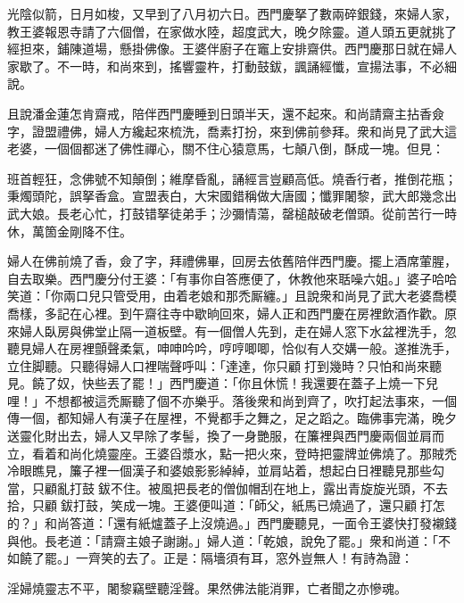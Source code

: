 光陰似箭，日月如梭，又早到了八月初六日。西門慶拏了數兩碎銀錢，來婦人家，教王婆報恩寺請了六個僧，在家做水陸，超度武大，晚夕除靈。道人頭五更就挑了經担來，鋪陳道場，懸掛佛像。王婆伴廚子在竈上安排齋供。西門慶那日就在婦人家歇了。不一時，和尚來到，搖響靈杵，打動鼓鈸，諷誦經懺，宣揚法事，不必細說。

且說潘金蓮怎肯齋戒，陪伴西門慶睡到日頭半天，還不起來。和尚請齋主拈香僉字，證盟禮佛，婦人方纔起來梳洗，喬素打扮，來到佛前參拜。衆和尚見了武大這老婆，一個個都迷了佛性禪心，關不住心猿意馬，七顛八倒，酥成一塊。但見：

\begin{myquote} 
班首輕狂，念佛號不知顛倒；維摩昏亂，誦經言豈顧高低。燒香行者，推倒花瓶；秉燭頭陀，誤拏香盒。宣盟表白，大宋國錯稱做大唐國；懺罪闍黎，武大郎幾念出武大娘。長老心忙，打鼓错拏徒弟手；沙彌情蕩，罄槌敲破老僧頭。從前苦行一時休，萬箇金剛降不住。
\end{myquote} 

婦人在佛前燒了香，僉了字，拜禮佛畢，回房去依舊陪伴西門慶。擺上酒席葷腥，自去取樂。西門慶分付王婆：「有事你自答應便了，休教他來聒噪六姐。」婆子哈哈笑道：「你兩口兒只管受用，由着老娘和那禿厮纏。」{}且說衆和尚見了武大老婆喬模喬樣，多記在心裡。到午齋往寺中歇晌回來，婦人正和西門慶在房裡飲酒作歡。原來婦人臥房與佛堂止隔一道板壁。有一個僧人先到，走在婦人窓下水盆裡洗手，忽聽見婦人在房裡顫聲柔氣，呻呻吟吟，哼哼唧唧，恰似有人交媾一般。遂推洗手，立住脚聽。{}{}只聽得婦人口裡喘聲呼叫：「達達，你只顧𢵞打到幾時？只怕和尚來聽見。饒了奴，快些丟了罷！」西門慶道：「你且休慌！我還要在蓋子上燒一下兒哩！」不想都被這禿厮聽了個不亦樂乎。落後衆和尚到齊了，吹打起法事來，一個傳一個，都知婦人有漢子在屋裡，不覺都手之舞之，足之蹈之。臨佛事完滿，晚夕送靈化財出去，婦人又早除了孝髻，換了一身艷服，在簾裡與西門慶兩個並肩而立，看着和尚化燒靈座。王婆舀漿水，點一把火來，登時把靈牌並佛燒了。那賊禿冷眼瞧見，簾子裡一個漢子和婆娘影影綽綽，並肩站着，想起白日裡聽見那些勾當，只顧亂打鼓𢵞鈸不住。被風把長老的僧伽帽刮在地上，露出青旋旋光頭，不去拾，只顧𢵞鈸打鼓，笑成一塊。{}王婆便叫道：「師父，紙馬已燒過了，還只顧𢵞打怎的？」和尚答道：「還有紙爐蓋子上沒燒過。」西門慶聽見，一面令王婆快打發襯錢與他。長老道：「請齋主娘子謝謝。」婦人道：「乾娘，說免了罷。」衆和尚道：「不如饒了罷。」一齊笑的去了。正是：隔墻須有耳，窓外豈無人！有詩為證：

\begin{myquote} 
淫婦燒靈志不平，闍黎竊壁聽淫聲。果然佛法能消罪，亡者聞之亦慘魂。
\end{myquote} 

